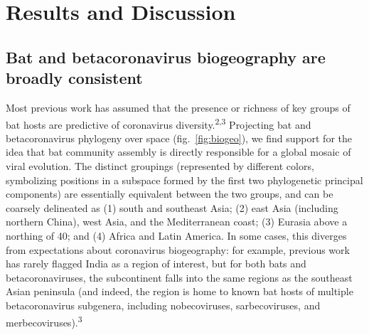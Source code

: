 \documentclass[10pt,oneside]{article}
\begin{document}
\hypertarget{results-and-discussion}{%
\section{Results and Discussion}\label{results-and-discussion}}

\hypertarget{bat-and-betacoronavirus-biogeography-are-broadly-consistent}{%
\subsection{Bat and betacoronavirus biogeography are broadly
consistent}\label{bat-and-betacoronavirus-biogeography-are-broadly-consistent}}

Most previous work has assumed that the presence or richness of key
groups of bat hosts are predictive of coronavirus
diversity.\textsuperscript{2,3} Projecting bat and betacoronavirus
phylogeny over space (fig.~\ref{fig:biogeo}), we find support for the
idea that bat community assembly is directly responsible for a global
mosaic of viral evolution. The distinct groupings (represented by
different colors, symbolizing positions in a subspace formed by the
first two phylogenetic principal components) are essentially equivalent
between the two groups, and can be coarsely delineated as (1) south and
southeast Asia; (2) east Asia (including northern China), west Asia, and
the Mediterranean coast; (3) Eurasia above a northing of 40; and (4)
Africa and Latin America. In some cases, this diverges from expectations
about coronavirus biogeography: for example, previous work has rarely
flagged India as a region of interest, but for both bats and
betacoronaviruses, the subcontinent falls into the same regions as the
southeast Asian peninsula (and indeed, the region is home to known bat
hosts of multiple betacoronavirus subgenera, including nobecoviruses,
sarbecoviruses, and merbecoviruses).\textsuperscript{3}
\end{document}
